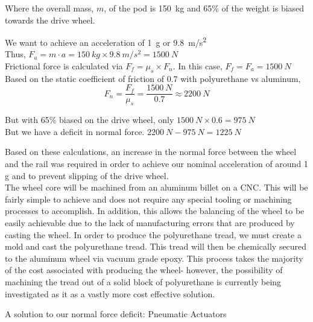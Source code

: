 \documentclass[main.tex]{subfiles}
\begin{document}
    Where the overall mass, $m$, of the pod is \SI{150}{kg} and 65\% of the weight is biased towards the drive wheel.

    \begin{center}
        We want to achieve an acceleration of \SI{1}{g} or \SI{9.8}{m/s^2}\\

        Thus, $F_a=m\cdot a = \SI{150}{kg} \times \SI{9.8}{m/s^2} = \SI{1500}{N}$\\

        Frictional force is calculated via $F_f=\mu_s \times F_n$. In this case, $F_f=F_a=\SI{1500}{N}$\\

        Based on the static coefficient of friction of 0.7 with polyurethane vs aluminum,
        \[
        F_n = \frac{F_f}{\mu_s} = \frac{\SI{1500}{N}}{0.7} \approx \SI{2200}{N}
        \]

        But with 65\% biased on the drive wheel, only $\SI{1500}{N} \times 0.6 = \SI{975}{N}$\\

        But we have a deficit in normal force. $\SI{2200}{N} -\SI{975}{N}=\SI{1225}{N}$
    \end{center}
    Based on these calculations, an increase in the normal force between the wheel and the rail was required in order to achieve our nominal acceleration of around 1 g and to prevent slipping of the drive wheel.\\

    The wheel core will be machined from an aluminum billet on a CNC. This will be fairly simple to achieve and does not require any special tooling or machining processes to accomplish. In addition, this allows the balancing of the wheel to be easily achievable due to the lack of manufacturing errors that are produced by casting the wheel. In order to produce the polyurethane tread, we must create a mold and cast the polyurethane tread. This tread will then be chemically secured to the aluminum wheel via vacuum grade epoxy. This process takes the majority of the cost associated with producing the wheel- however, the possibility of machining the tread out of a solid block of polyurethane is currently being investigated as it as a vastly more cost effective solution.

    A solution to our normal force deficit: Pneumatic Actuators\\
\end{document}

